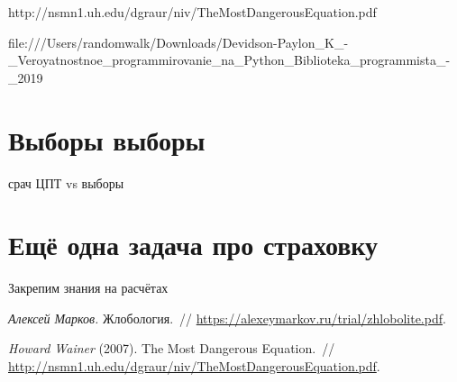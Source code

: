 \documentclass[12pt, a4paper, oneside]{article}
\begin{document}
http://nsmn1.uh.edu/dgraur/niv/TheMostDangerousEquation.pdf

file:///Users/randomwalk/Downloads/Devidson-Paylon_K_-_Veroyatnostnoe_programmirovanie_na_Python_Biblioteka_programmista_-_2019%


\section{Выборы выборы}

срач ЦПТ vs выборы 


\section{Ещё одна задача про страховку}

Закрепим знания на расчётах 



\begin{thebibliography}{1}
	
	
	
	\emph{Алексей Марков.}
	Жлобология.~//
	\url{https://alexeymarkov.ru/trial/zhlobolite.pdf}.
	
	\emph{Howard Wainer} (2007).
	The Most Dangerous Equation.~//
	\url{http://nsmn1.uh.edu/dgraur/niv/TheMostDangerousEquation.pdf}.
	

\end{thebibliography}
\end{document}
